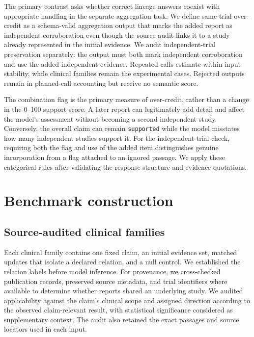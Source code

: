 \documentclass[11pt]{article}
\begin{document}
The primary contrast asks whether correct lineage answers coexist with appropriate handling in the separate aggregation task. We define same-trial over-credit as a schema-valid aggregation output that marks the added report as independent corroboration even though the source audit links it to a study already represented in the initial evidence. We audit independent-trial preservation separately: the output must both mark independent corroboration and use the added independent evidence. Repeated calls estimate within-input stability, while clinical families remain the experimental cases. Rejected outputs remain in planned-call accounting but receive no semantic score.

The combination flag is the primary measure of over-credit, rather than a change in the 0--100 support score. A later report can legitimately add detail and affect the model's assessment without becoming a second independent study. Conversely, the overall claim can remain \texttt{supported} while the model misstates how many independent studies support it. For the independent-trial check, requiring both the flag and use of the added item distinguishes genuine incorporation from a flag attached to an ignored passage. We apply these categorical rules after validating the response structure and evidence quotations.


\section{Benchmark construction}
\label{sec:benchmark}

\subsection{Source-audited clinical families}

Each clinical family contains one fixed claim, an initial evidence set, matched updates that isolate a declared relation, and a null control. We established the relation labels before model inference. For provenance, we cross-checked publication records, preserved source metadata, and trial identifiers where available to determine whether reports shared an underlying study. We audited applicability against the claim's clinical scope and assigned direction according to the observed claim-relevant result, with statistical significance considered as supplementary context. The audit also retained the exact passages and source locators used in each input.
\end{document}
